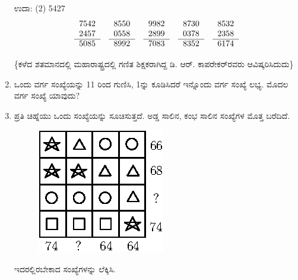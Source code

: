 \begin{enumerate}
ಉದಾ: (2) 5427
\begin{equation*}
\begin{tabular}[t]{r}
7542 \\
2457\\\cline{1-1} 
5085
\end{tabular}
\quad
\begin{tabular}[t]{r}
8550\\ 
0558\\\cline{1-1} 
8992
\end{tabular}
\quad
\begin{tabular}[t]{r}
9982\\ 
2899\\\cline{1-1} 
7083
\end{tabular}
\quad
\begin{tabular}[t]{r}
8730\\ 
0378\\\cline{1-1} 
8352
\end{tabular}
\quad
\begin{tabular}[t]{r}
8532\\ 
2358\\\cline{1-1} 
6174
\end{tabular}
\end{equation*}

\{ಕಳೆದ ಶತಮಾನದಲ್ಲಿ ಮಹಾರಾಷ್ಟ್ರದಲ್ಲಿ ಗಣಿತ ಶಿಕ್ಷಕರಾಗಿದ್ದ ಡಿ. ಆರ್. ಕಾಪರೇಕರ್‌ರವರು ಆವಿಷ್ಕರಿಸಿದುದು\}

\item  ಒಂದು ವರ್ಗ ಸಂಖ್ಯೆಯನ್ನು 11 ರಿಂದ ಗುಣಿಸಿ, 1ನ್ನು ಕೂಡಿಸಿದರೆ ಇನ್ನೊಂದು ವರ್ಗ ಸಂಖ್ಯೆ ಲಭ್ಯ. ಮೊದಲ ವರ್ಗ ಸಂಖ್ಯೆ ಯಾವುದು? 

\item ಪ್ರತಿ ಚಿಹ್ನೆಯು ಒಂದು ಸಂಖ್ಯೆಯನ್ನು ಸೂಚಿಸುತ್ತದೆ. ಅಡ್ಡ ಸಾಲಿನ, ಕಂಭ ಸಾಲಿನ ಸಂಖ್ಯೆಗಳ ಮೊತ್ತ ಬರೆದಿದೆ. 
\begin{figure}[H]
\centering
\includegraphics{images/chap6/q30.eps}
\end{figure}

ಇದರಲ್ಲಿರಬೇಕಾದ ಸಂಖ್ಯೆಗಳನ್ನು  ಲೆಕ್ಕಿಸಿ. 
\end{enumerate}

